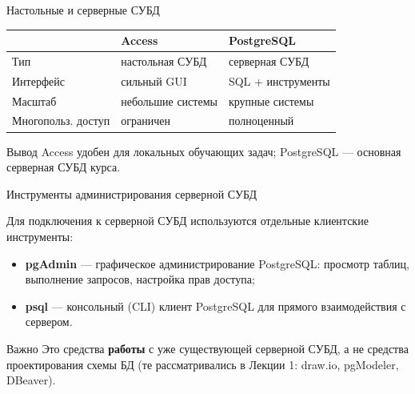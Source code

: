 \documentclass[aspectratio=169]{beamer}
\begin{document}
\begin{frame}{Настольные и серверные СУБД}

\small
\begin{table}
\centering
\begin{tabular}{p{}|p{}|p{}}
\toprule
 & \textbf{Access} & \textbf{PostgreSQL}\\
\midrule
Тип & настольная СУБД & серверная СУБД\\
Интерфейс & сильный GUI & SQL + инструменты\\
Масштаб & небольшие системы & крупные системы\\
Многопольз. доступ & ограничен & полноценный\\
\bottomrule
\end{tabular}
\end{table}

\normalsize

\vspace{0.4cm}

\begin{block}{Вывод}
Access удобен для локальных обучающих задач;
PostgreSQL — основная серверная СУБД курса.
\end{block}

\end{frame}


\begin{frame}{Инструменты администрирования серверной СУБД}

Для подключения к серверной СУБД используются
отдельные клиентские инструменты:

\vspace{0.4cm}

\begin{itemize}
  \item \textbf{pgAdmin} — графическое администрирование
        PostgreSQL: просмотр таблиц, выполнение запросов,
        настройка прав доступа;
  \item \textbf{psql} — консольный (CLI) клиент PostgreSQL
        для прямого взаимодействия с сервером.
\end{itemize}

\vspace{0.4cm}

\begin{alertblock}{Важно}
Это средства \textbf{работы} с уже существующей серверной
СУБД, а не средства проектирования схемы БД
(те рассматривались в Лекции 1: draw.io, pgModeler, DBeaver).
\end{alertblock}

\end{frame}
\end{document}
